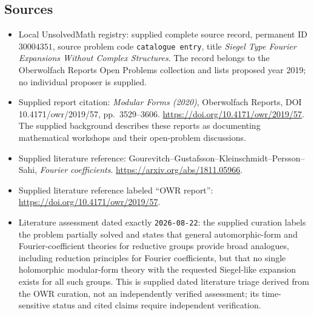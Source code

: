 \documentclass[11pt]{article}
\begin{document}
\subsection{Sources}
\begin{itemize}
\item Local UnsolvedMath registry: supplied complete source record, permanent ID \(30004351\), source problem code \texttt{catalogue entry}, title \emph{Siegel Type Fourier Expansions Without Complex Structures}. The record belongs to the Oberwolfach Reports Open Problems collection and lists proposed year 2019; no individual proposer is supplied.
\item Supplied report citation: \emph{Modular Forms (2020)}, Oberwolfach Reports, DOI 10.4171/owr/2019/57, pp.\ 3529--3606. \url{https://doi.org/10.4171/owr/2019/57}. The supplied background describes these reports as documenting mathematical workshops and their open-problem discussions.
\item Supplied literature reference: Gourevitch--Gustafsson--Kleinschmidt--Persson--Sahi, \emph{Fourier coefficients}. \url{https://arxiv.org/abs/1811.05966}.
\item Supplied literature reference labeled ``OWR report'': \url{https://doi.org/10.4171/owr/2019/57}.
\item Literature assessment dated exactly \texttt{2026-08-22}: the supplied curation labels the problem partially solved and states that general automorphic-form and Fourier-coefficient theories for reductive groups provide broad analogues, including reduction principles for Fourier coefficients, but that no single holomorphic modular-form theory with the requested Siegel-like expansion exists for all such groups. This is supplied dated literature triage derived from the OWR curation, not an independently verified assessment; its time-sensitive status and cited claims require independent verification.
\end{itemize}
\end{document}
